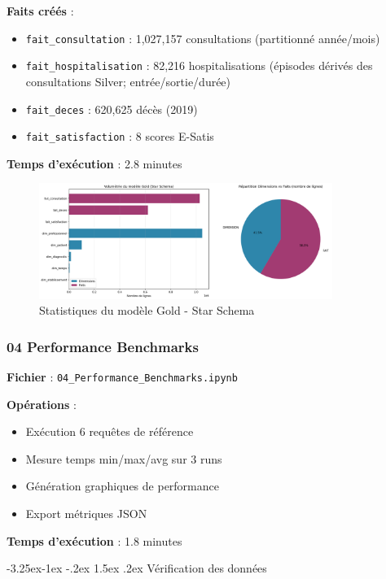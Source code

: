 \documentclass[12pt,a4paper]{article}
\makeatletter
\renewcommand\subsection{\@startsection{subsection}{2}{\z@}%
    {-3.25ex\@plus -1ex \@minus -.2ex}%
    {1.5ex \@plus .2ex}%
    {\normalfont\large\bfseries\color{blue!50!black}}}
\makeatother
\begin{document}
\textbf{Faits créés} :
\begin{itemize}
\item \texttt{fait\_consultation} : 1,027,157 consultations (partitionné année/mois)
\item \texttt{fait\_hospitalisation} : 82,216 hospitalisations (épisodes dérivés des consultations Silver; entrée/sortie/durée)
\item \texttt{fait\_deces} : 620,625 décès (2019)
\item \texttt{fait\_satisfaction} : 8 scores E-Satis
\end{itemize}

\textbf{Temps d'exécution} : 2.8 minutes

\begin{figure}[H]
\centering
\includegraphics[width=0.85\textwidth]{gold_star_schema_stats.png}
\caption{Statistiques du modèle Gold - Star Schema}
\label{fig:gold_stats}
\end{figure}

\subsubsection{04 Performance Benchmarks}

\textbf{Fichier} : \texttt{04\_Performance\_Benchmarks.ipynb}

\textbf{Opérations} :
\begin{itemize}
\item Exécution 6 requêtes de référence
\item Mesure temps min/max/avg sur 3 runs
\item Génération graphiques de performance
\item Export métriques JSON
\end{itemize}

\textbf{Temps d'exécution} : 1.8 minutes

\subsection{Vérification des données}
\end{document}
